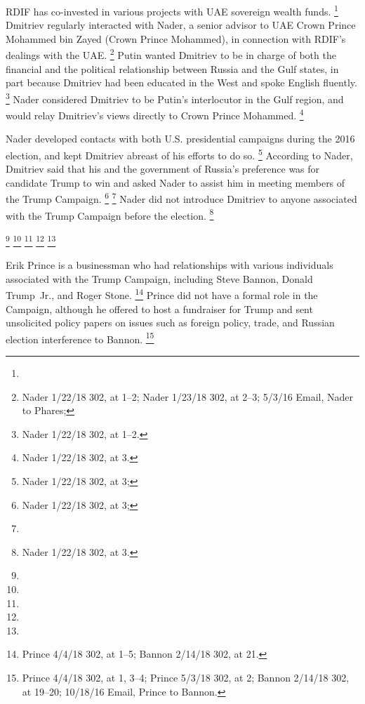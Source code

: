 RDIF has co-invested in various projects with UAE sovereign wealth funds.%
\footnote{}
Dmitriev regularly interacted with Nader, a senior advisor to UAE Crown Prince Mohammed bin Zayed (Crown Prince Mohammed), in connection with RDIF's dealings with the UAE\null.%
\footnote{Nader 1/22/18 302, at 1--2;
Nader 1/23/18 302, at 2--3;
5/3/16 Email, Nader to Phares;
}
Putin wanted Dmitriev to be in charge of both the financial and the political relationship between Russia and the Gulf states, in part because Dmitriev had been educated in the West and spoke English fluently.%
\footnote{Nader 1/22/18 302, at 1--2.}
Nader considered Dmitriev to be Putin's interlocutor in the Gulf region, and would relay Dmitriev's views directly to Crown Prince Mohammed.%
\footnote{Nader 1/22/18 302, at 3.}

Nader developed contacts with both U.S. presidential campaigns during the 2016 election, and kept Dmitriev abreast of his efforts to do so.%
\footnote{Nader 1/22/18 302, at 3; }
According to Nader, Dmitriev said that his and the government of Russia's preference was for candidate Trump to win and asked Nader to assist him in meeting members of the Trump Campaign.%
\footnote{Nader 1/22/18 302, at 3; }
\footnote{}
Nader did not introduce Dmitriev to anyone associated with the Trump Campaign before the election.%
\footnote{Nader 1/22/18 302, at 3.}

\footnote{}
\footnote{}
\footnote{}
\footnote{}
\footnote{}

Erik Prince is a businessman who had relationships with various individuals associated with the Trump Campaign, including Steve Bannon, Donald Trump~Jr., and Roger Stone.%
\footnote{Prince 4/4/18 302, at 1--5;
Bannon 2/14/18 302, at 21.}
Prince did not have a formal role in the Campaign, although he offered to host a fundraiser for Trump and sent unsolicited policy papers on issues such as foreign policy, trade, and Russian election interference to Bannon.%
\footnote{Prince 4/4/18 302, at 1, 3--4;
Prince 5/3/18 302, at 2;
Bannon 2/14/18 302, at 19--20;
10/18/16 Email, Prince to Bannon.}

